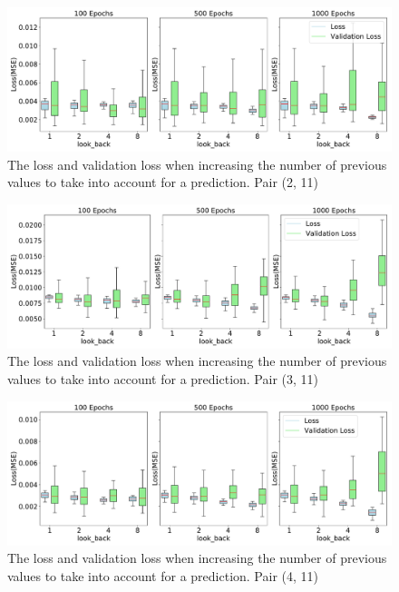 	\begin{figure}[H]
		\centering
		\includegraphics[width=1\linewidth]{Pictures/Results/experiment_2_1_2}
		\caption{The loss and validation loss when increasing the number of previous values to take into account for a prediction. Pair (2, 11)}
		\label{fig:experiment_2_1_2}
	\end{figure}
	\begin{figure}[H]
		\centering
		\includegraphics[width=1\linewidth]{Pictures/Results/experiment_2_1_3}
		\caption{The loss and validation loss when increasing the number of previous values to take into account for a prediction. Pair (3, 11)}
		\label{fig:experiment_2_1_3}
	\end{figure}
	\begin{figure}[H]
		\centering
		\includegraphics[width=1\linewidth]{Pictures/Results/experiment_2_1_4}
		\caption{The loss and validation loss when increasing the number of previous values to take into account for a prediction. Pair (4, 11)}
		\label{fig:experiment_2_1_4}
	\end{figure}
